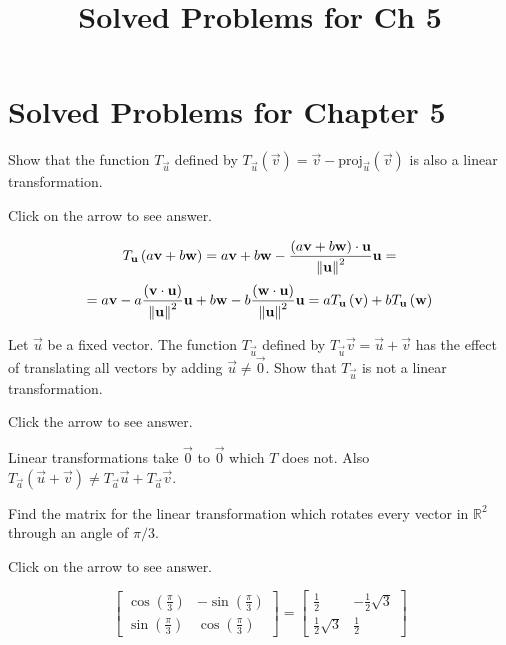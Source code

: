 \documentclass{ximera}
\title{Solved Problems for Ch 5} \license{CC BY-NC-SA 4.0}
\begin{document}
\begin{abstract}
\end{abstract}
\maketitle

\section*{Solved Problems for Chapter 5}

\begin{problem}\label{prb:6.2} Show that the function $T_{\vec{u}}$ defined by $T_{\vec{u}}
\left( \vec{v}\right) = \vec{v}-\mbox{proj}_{\vec{u}}\left(
\vec{v}\right) $ is also a linear transformation.

Click on the arrow to see answer.

\begin{expandable}
$$
T_{\mathbf{u}}\left( a\mathbf{v}+b\mathbf{w}\right) =a\mathbf{v}+b\mathbf{w}-\frac{\left( a\mathbf{v}+b\mathbf{w}\right)\cdot \mathbf{u} }{\left\lVert \mathbf{u}
\right\rVert ^{2}}\mathbf{u} =$$
$$
=a\mathbf{v}-a\frac{\left( \mathbf{v}\cdot \mathbf{u}\right) }{\left\lVert \mathbf{u} \right\rVert ^{2}}\mathbf{u}+b\mathbf{w}-b\frac{\left( \mathbf{w}\cdot \mathbf{u}
\right) }{\left\lVert \mathbf{u}\right\rVert ^{2}}\mathbf{u}
=aT_{\mathbf{u}}\left( \mathbf{v}\right) +bT_{\mathbf{u}}\left( \mathbf{w}
\right)
$$
\end{expandable}
\end{problem}

\begin{problem}\label{prb:6.3} Let $\vec{u}$ be a fixed vector. The function
$T_{\vec{u}}$ defined by $T_{\vec{u}}\vec{v}=\vec{u}+\vec{v}$ has the effect of
translating all vectors by adding $\vec{u}\neq \vec{0}$. Show that $T_{\vec{u}}$ is not a
linear transformation. 

Click the arrow to see answer.

\begin{expandable}
Linear
transformations take $\vec{0}$ to $\vec{0}$ which $T$ does not. Also $T_{\vec{a}}\left( \vec{u}+\vec{v}\right) \neq T_{\vec{a}}\vec{u}+T_{\vec{a}}
\vec{v}$.
\end{expandable}
\end{problem}

\begin{problem}\label{prb:6.11}  Find the matrix for the linear transformation which
rotates every vector in $\mathbb{R}^{2}$ through an angle of $\pi /3.$

Click on the arrow to see answer.
\begin{expandable}
$$\left[
\begin{array}{cc}
\cos \left(
\frac{\pi }{3}\right) & -\sin \left( \frac{\pi }{3}\right) \\
\sin \left( \frac{\pi }{3}\right) & \cos \left( \frac{\pi }{3}\right)%
\end{array}
\right] = \left[
\begin{array}{cc}
\frac{1}{2} & -\frac{1}{2}\sqrt{3} \\
\frac{1}{2}\sqrt{3} & \frac{1}{2}
\end{array}
\right] $$
\end{expandable}
\end{problem}
\end{document}
